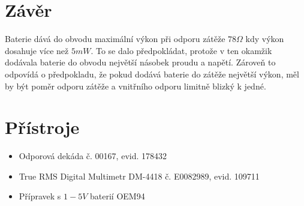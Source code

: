 \documentclass[12pt]{article} %
\begin{document}
\section{Závěr}
Baterie dává do obvodu maximální výkon při odporu zátěže $78\Omega$ kdy výkon dosahuje více než $5mW$. To se dalo předpokládat, protože v ten okamžik dodávala baterie do obvodu největší násobek proudu a napětí. Zároveň to odpovídá o předpokladu, že pokud dodává baterie do zátěže největší výkon, měl by být poměr odporu zátěže a vnitřního odporu limitně blizký k jedné.

\section{Přístroje}
\begin{itemize}
\item Odporová dekáda č. 00167, evid. 178432
\item True RMS Digital Multimetr DM-4418 č. E0082989, evid. 109711
\item Přípravek s $1-5V$ baterií  OEM94
\end{itemize}
\end{document}

